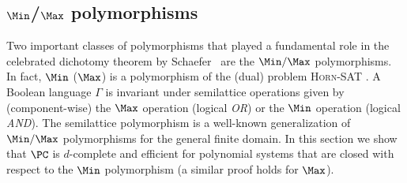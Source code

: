\documentclass[11pt]{article}
\begin{document}
\subsection[Min/Max polymorphisms]{$\Min$/$\Max$ polymorphisms}



Two important classes of polymorphisms that played a fundamental role in the celebrated dichotomy theorem by Schaefer~\cite{Schaefer78} are the $\Min/\Max$ polymorphisms. In fact, $\Min$ ($\Max$) is a polymorphism of the (dual) problem \textsc{Horn-SAT} \cite{JEAVONS_TRACTABLE_CONSTRAINTS}. A Boolean language $\Gamma$ is invariant under semilattice operations given by (component-wise) the $\Max$ operation (logical \emph{OR}) or the $\Min$ operation (logical \emph{AND}). The semilattice polymorphism is a well-known generalization of $\Min/\Max$ polymorphisms for the general finite domain.
%
In this section we show that $\PC$ is $d$-complete and efficient for polynomial systems that are closed with respect to the $\Min$ polymorphism (a similar proof holds for $\Max$). 
%
%
%
%
%
\end{document}
